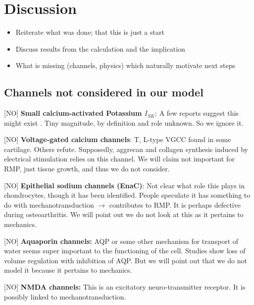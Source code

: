 \section{Discussion}
\label{sec:discussion}


\begin{itemize}
  \item Reiterate what was done; that this is just a start
  \item Discuss results from the calculation and the implication
  \item What is missing (channels, physics) which naturally motivate
    next steps
\end{itemize}

\subsection{Channels not considered in our model}
\label{sec:channels-ignored}

[NO] {\bf Small calcium-activated Potassium $I_{SK}$}: A few reports
suggest this might exist \citep{Halletal1996,
  BarrettJolleyetal2010}. Tiny magnitude, by definition and role
unknown. So we ignore it.

[NO] {\bf Voltage-gated calcium channels}: T, L-type VGCC found in
some cartilage. Others refute. Supposedly, aggrecan and collagen
synthesis induced by electrical stimulation relies on this channel. We
will claim not important for RMP, just tissue growth, and thus we do
not consider.

[NO] {\bf Epithelial sodium channels (EnaC)}: Not clear what role this
plays in chondrocytes, though it has been identified. People speculate
it has something to do with mechanotransduction $\rightarrow$
contributes to RMP. It is perhaps defective during osteoarthritis. We
will point out we do not look at this as it pertains to mechanics.

[NO] {\bf Aquaporin channels:} AQP or some other mechanism for
transport of water seems super important to the functioning of the
cell. Studies show loss of volume regulation with inhibition of
AQP. But we will point out that we do not model it because it pertains
to mechanics.

[NO] {\bf NMDA channels:} This is an excitatory neuro-transmitter
receptor. It is possibly linked to mechanotransduction.

